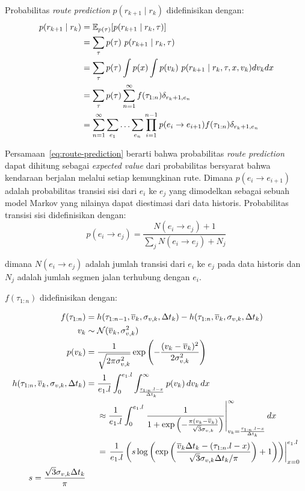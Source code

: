 Probabilitas \textit{route prediction} $p(r_{k+1}\mid r_k)$ didefinisikan dengan:
\begin{align}
p(r_{k+1}\mid r_k)&= \mathbb{E}_{p(\tau)}[p(r_{k+1} \mid r_k, \tau)] \notag \\
&=\sum_{\tau}p(\tau) \ p(r_{k+1} \mid r_k, \tau)  \notag \\
&=\sum_{\tau}p(\tau)\int p(x) \int p(v_k)\  p(r_{k+1}\mid r_k,\tau, x , v_k)dv_kdx \notag \\
&=\sum_{\tau}p(\tau)\sum_{n=1}^{\infty}f(\tau_{1:n})\delta_{r_k+1,e_n}  \notag 
\\&=\sum_{n=1}^{\infty}\sum_{e_1}\ldots\sum_{e_n}\prod_{i=1}^{n-1}p(e_i\rightarrow e_{i+1})f(\tau_{1:n})\delta_{r_k+1,e_n} 
\label{eq:route-prediction}
\end{align}

Persamaan~\ref{eq:route-prediction} berarti bahwa probabilitas \textit{route prediction} dapat dihitung sebagai \textit{expected value} dari probabilitas bersyarat bahwa kendaraan berjalan melalui setiap kemungkinan rute. Dimana $p(e_i\rightarrow e_{i+1})$ adalah probabilitas transisi sisi dari $e_i$ ke $e_j$ yang dimodelkan sebagai sebuah model Markov yang nilainya dapat diestimasi dari data historis. Probabilitas transisi sisi didefinisikan dengan:
\begin{equation}
p(e_i\rightarrow e_j)=\frac{N(e_i\rightarrow e_j) + 1}{\sum_{j}N(e_i\rightarrow e_j)+N_j}
\end{equation}

dimana $N(e_i\rightarrow e_j)$ adalah jumlah transisi dari $e_i$ ke $e_j$ pada data historis dan $N_j$ adalah jumlah segmen jalan terhubung dengan $e_i$.


$f(\tau_{1:n})$ didefinisikan dengan:

\begin{align}
    f(\tau_{1:n}) 
    &= h(\tau_{1:n-1},\overline{v}_k,\sigma_{v,k},\Delta t_k) 
    - h(\tau_{1:n},\overline{v}_k,\sigma_{v,k},\Delta t_k) \\
    v_k&\sim \mathcal{N}(\overline{v}_k,\sigma^2_{v,k})  \notag  \\
    p(v_k)
    &=\frac{1}{\sqrt{2\pi\sigma_{v,k}^2}}\exp\left(-\frac{(v_k-\overline{v}_k)^2}{2\sigma_{v,k}^2}\right)\\
    h(\tau_{1:n},\overline{v}_k,\sigma_{v,k},\Delta t_k) 
    &= \begin{aligned}[t]
        &\frac{1}{e_1.l}\int_0^{e_1.l}\int_{\frac{\tau_{1:n}.l - x}{\Delta t_k}}^{\infty} p(v_k)\,dv_k\,dx \\
        &\approx \frac{1}{e_1.l} \int_0^{e_1.l} 
        \left. \frac{1}{1+\exp \left(-\frac{\pi(v_k-\overline{v}_k)}{\sqrt{3}\sigma_{v,k}} \right)}\right|_{v_k=\frac{\tau_{1:n}.l - x}{\Delta t_k}}^{\infty} dx \\
        &= \left. \frac{1}{e_1.l} \left( s \log \left( \exp\left( \frac{\overline{v}_k\Delta t_k-(\tau_{1:n}.l - x)}{\sqrt{3}\sigma_{v,k}\Delta t_k/\pi} \right)+1 \right) \right) \right|_{x=0}^{e_1.l}  
    \end{aligned} \\
    s=\frac{\sqrt{3}\sigma_{v,k}\Delta t_k}{\pi} \notag \\
\end{align}


